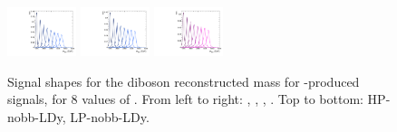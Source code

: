 \begin{figure}[htbp]
  \includegraphics[width=0.18\textwidth]{fig/2Dfit/templateSignalVsMX_fromDC_VBFRadToWW_MVV_mu_LP_nobb_LDy.pdf}
  \includegraphics[width=0.18\textwidth]{fig/2Dfit/templateSignalVsMX_fromDC_VBFZprToWW_MVV_mu_LP_nobb_LDy.pdf}
  \includegraphics[width=0.18\textwidth]{fig/2Dfit/templateSignalVsMX_fromDC_VBFWprToWZ_MVV_mu_LP_nobb_LDy.pdf}\\
  \caption{
    Signal shapes for the diboson reconstructed mass \MVV for \VBF-produced signals, for 8 values of \MX.
    From left to right: \GBulktoWW, \RadtoWW, \ZprtoWW, \WprtoWZ.
    Top to bottom: HP-nobb-LDy, LP-nobb-LDy.
  }
  \label{fig:MVVShapes_VBF_LDy_Run2}
\end{figure}

